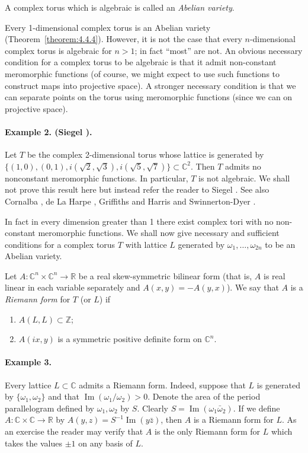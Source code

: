  A complex torus which is algebraic is called an \emph{Abelian variety}.

Every 1-dimensional complex torus is an Abelian variety (Theorem~\ref{theorem:4.4.4}). However, it is not the case that every $n$-dimensional complex torus is algebraic for $n>1$; in fact ``most'' are not. An obvious necessary condition for a complex torus to be algebraic is that it admit non-constant meromorphic functions (of course, we might expect to use such functions to construct maps into projective space). A stronger necessary condition is that we can separate points on the torus using meromorphic functions (since we can on projective space).
\paragraph*{Example 2. (Siegel \cite{bib:I:siegel-c-l:2}).} Let $T$ be the complex 2-dimensional torus whose lattice is generated by $\{(1,0),(0,1),i(\sqrt2,\sqrt3),i(\sqrt5,\sqrt7)\}\subset\mathbb C^2$. Then $T$ admits no nonconstant meromorphic functions. In particular, $T$ is not algebraic. We shall not prove this result here but instead refer the reader to Siegel \cite{bib:I:siegel-c-l:2}. See also Cornalba \cite[page 85]{bib:I:cornalba-m:1}, de La Harpe \cite[page 142]{bib:I:de-la-harpe-p:1}, Griffiths and Harris \cite{bib:I:griffiths-p-and-harris-j:1} and Swinnerton-Dyer \cite{bib:I:swinnerton-dyer-h-p-f:1}.

In fact in every dimension greater than 1 there exist complex tori with no non-constant meromorphic functions. We shall now give necessary and sufficient conditions for a complex torus $T$ with lattice $L$ generated by $\omega_1,\ldots,\omega_{2n}$ to be an Abelian variety.

Let $A:\mathbb C^n\times\mathbb C^n\longrightarrow\mathbb R$ be a real skew-symmetric bilinear form (that is, $A$ is real linear in each variable separately and $A(x,y)=-A(y,x)$). We say that $A$ is a \emph{Riemann form} for $T$ (or $L$) if
\begin{enumerate}
\item $A(L,L)\subset\mathbb Z$;
\item $A(ix,y)$ is a symmetric positive definite form on $\mathbb C^n$.
\end{enumerate}

\paragraph*{Example 3.} Every lattice $L\subset\mathbb C$ admits a Riemann form. Indeed, suppose that $L$ is generated by $\{\omega_1,\omega_2\}$ and that $\operatorname{Im}(\omega_1/\omega_2)>0$. Denote the area of the period parallelogram defined by $\omega_1,\omega_2$ by $S$. Clearly $S=\operatorname{Im}(\omega_1\bar\omega_2)$. If we define $A:\mathbb C\times\mathbb C\longrightarrow\mathbb R$ by $A(y,z)=S^{-1}\operatorname{Im}(y\bar z)$, then $A$ is a Riemann form for $L$. As an exercise the reader may verify that $A$ is the only Riemann form for $L$ which takes the values $\pm1$ on any basis of $L$.

